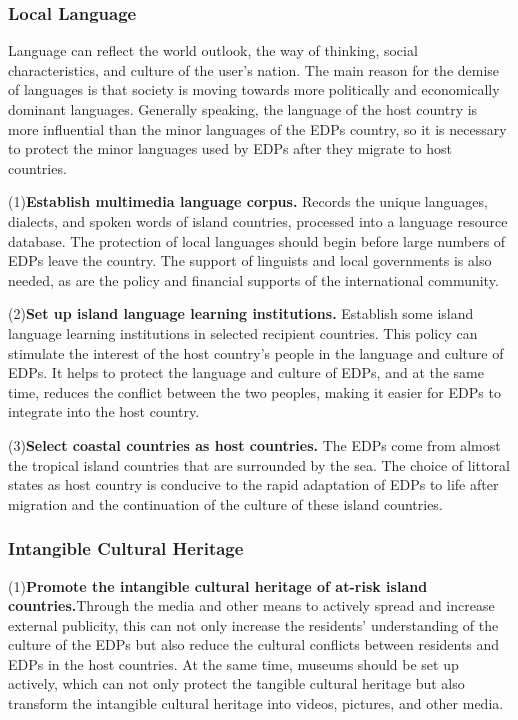\documentclass[12pt]{article}  %
\begin{document}
\subsubsection{Local Language}
Language can reflect the world outlook, the way of thinking, social characteristics, and culture of the user's nation. The main reason for the demise of languages is that society is moving towards more politically and economically dominant languages. Generally speaking, the language of the host country is more influential than the minor languages of the EDPs country, so it is necessary to protect the minor languages used by EDPs after they migrate to host countries.



(1)\textbf{Establish multimedia language corpus.} Records the unique languages, dialects, and spoken words of island countries, processed into a language resource database. The protection of local languages should begin before large numbers of EDPs leave the country. The support of linguists and local governments is also needed, as are the policy and financial supports of the international community.


(2)\textbf{Set up island language learning institutions.} Establish some island language learning institutions in selected recipient countries. This policy can stimulate the interest of the host country's people in the language and culture of EDPs. It helps to protect the language and culture of EDPs, and at the same time, reduces the conflict between the two peoples, making it easier for EDPs to integrate into the host country.



(3)\textbf{Select coastal countries as host countries.} The EDPs come from almost the tropical island countries that are surrounded by the sea. The choice of littoral states as host country is conducive to the rapid adaptation of EDPs to life after migration and the continuation of the culture of these island countries.





\subsubsection{Intangible Cultural Heritage}

(1)\textbf{Promote the intangible cultural heritage of at-risk island countries.}Through the media and other means to actively spread and increase external publicity, this can not only increase the residents' understanding of the culture of the EDPs but also reduce the cultural conflicts between residents and EDPs in the host countries. At the same time, museums should be set up actively, which can not only protect the tangible cultural heritage but also transform the intangible cultural heritage into videos, pictures, and other media.
\end{document}
